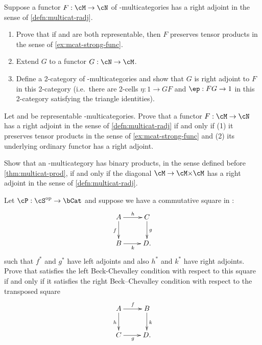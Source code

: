 \begin{ex}\label{ex:multicat-radj}
  Suppose a functor $F:\cM\to\cN$ of \fS-multicategories has a right adjoint in the sense of \cref{defn:multicat-radj}.
  \begin{enumerate}
  \item Prove that if \cM and \cN are both representable, then $F$ preserves tensor products in the sense of \cref{ex:mcat-strong-func}.
  \item Extend $G$ to a functor $G:\cN\to\cM$.
  \item Define a 2-category of \fS-multicategories and show that $G$ is right adjoint to $F$ in this 2-category (i.e.\ there are 2-cells $\eta : 1 \to G F$ and $\ep : F G \to 1$ in this 2-category satisfying the triangle identities).
  \end{enumerate}
\end{ex}

\begin{ex}\label{ex:moncat-radj}
  Let \cM and \cN be representable \fS-multicategories.
  Prove that a functor $F:\cM\to\cN$ has a right adjoint in the sense of \cref{defn:multicat-radj} if and only if (1) it preserves tensor products in the sense of \cref{ex:mcat-strong-func} and (2) its underlying ordinary functor has a right adjoint.
\end{ex}

\begin{ex}\label{ex:multicat-prod-ladj}
  Show that an \fS-multicategory \cM has binary products, in the sense defined before \cref{thm:multicat-prod}, if and only if the diagonal $\cM\to \cM\times \cM$ has a right adjoint in the sense of \cref{defn:multicat-radj}.
\end{ex}

\begin{ex}\label{ex:beck-chev}
  Let $\cP:\cS\op\to\bCat$ and suppose we have a commutative square in \cS:
  \[ \xymatrix{ A \ar[r]^h \ar[d]_f & C \ar[d]^g \\ B \ar[r]_k & D. } \]
  such that $f^*$ and $g^*$ have left adjoints and also $h^*$ and $k^*$ have right adjoints.
  Prove that \cP satisfies the left Beck-Chevalley condition with respect to this square if and only if it satisfies the right Beck--Chevalley condition with respect to the transposed square
  \[ \xymatrix{ A \ar[r]^f \ar[d]_h & B \ar[d]^k \\ C \ar[r]_g & D. } \]
\end{ex}

